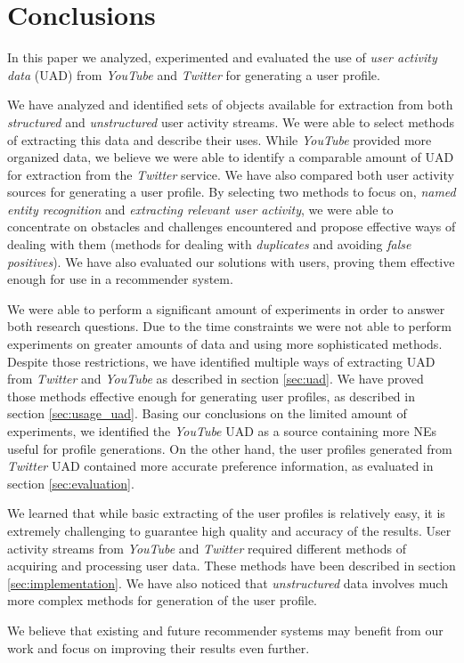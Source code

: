 \section{Conclusions}
\label{sec:conclusion}

In this paper we analyzed, experimented and evaluated the use of \textit{user activity data} (UAD) from \textit{YouTube}
and \textit{Twitter} for generating a user profile.

We have analyzed and identified sets of objects available for extraction from both \textit{structured} and
\textit{unstructured} user activity streams. We were able to select methods of extracting this data and describe
their uses. While \textit{YouTube} provided more organized data, we believe we were able to identify a comparable
amount of UAD for extraction from the \textit{Twitter} service.
We have also compared both user activity sources for generating a user profile. By selecting two methods to focus
on, \ie \textit{named entity recognition} and \textit{extracting relevant user activity}, we were able to concentrate
on obstacles and challenges encountered and propose effective ways of dealing with them (\ie methods for dealing with
\textit{duplicates} and avoiding \textit{false positives}). We have also evaluated our solutions with users, proving
them effective enough for use in a recommender system.

We were able to perform a significant amount of experiments in order to answer both research questions. Due to the time
constraints we were not able to perform experiments on greater amounts of data and using more sophisticated methods.
Despite those restrictions, we have identified multiple ways of extracting UAD from \textit{Twitter} and \textit{YouTube}
as described in section \ref{sec:uad}. We have proved those methods effective enough for generating user profiles, as
described in section \ref{sec:usage_uad}. Basing our conclusions on the limited amount of experiments, we identified
the \textit{YouTube} UAD as a source containing more NEs useful for profile generations. On the other hand, the
user profiles generated from \textit{Twitter} UAD contained more accurate preference information, as evaluated in section
\ref{sec:evaluation}.

We learned that while basic extracting of the user profiles is relatively easy, it is extremely challenging to
guarantee high quality and accuracy of the results. User activity streams from \textit{YouTube} and \textit{Twitter}
required different methods of acquiring and processing user data. These methods have been described in section
\ref{sec:implementation}. We have also noticed that \textit{unstructured} data involves much more complex methods
for generation of the user profile.

We believe that existing and future recommender systems may benefit from our work and focus on improving their results
even further.